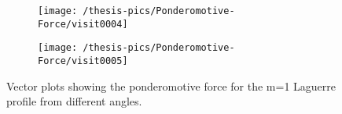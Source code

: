 \documentclass[12pt, class=report, crop=false]{standalone}
\begin{document}
\begin{figure}[!h]
  \centering
  \begin{subfigure}[t]{0.85\textwidth}
    \centering
    \texttt{[image: /thesis-pics/Ponderomotive-Force/visit0004]}
  \end{subfigure}
  \hfill
  \begin{subfigure}[t]{0.85\textwidth}
    \centering
    \texttt{[image: /thesis-pics/Ponderomotive-Force/visit0005]}
  \end{subfigure}
  \caption{Vector plots showing the ponderomotive force for the m=1 Laguerre profile from different angles.}
  \label{fig:ponderomotive-force-3}%
\end{figure}
\end{document}
